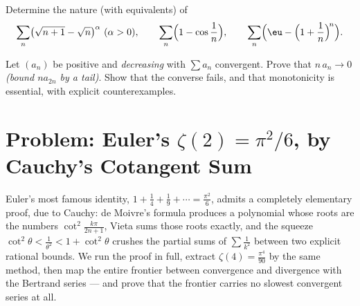\begin{exercise}[$\star\star$]\label{exo:b2:series:11}
Determine the nature (with equivalents) of
\[
\sum_n \bigl(\sqrt{n+1} - \sqrt n\bigr)^{\alpha}
\ (\alpha > 0), \qquad
\sum_n \Bigl(1 - \cos\frac1n\Bigr), \qquad
\sum_n \Bigl(\eu - \Bigl(1 + \frac1n\Bigr)^{\!n}\Bigr).
\]
\end{exercise}

\begin{exercise}[$\star\star\star$]\label{exo:b2:series:12}
Let $(a_n)$ be positive and \emph{decreasing} with $\sum a_n$
convergent. Prove that $n\,a_n \to 0$ \emph{(bound $n a_{2n}$ by a
tail)}. Show that the converse fails, and that monotonicity is
essential, with explicit counterexamples.
\end{exercise}

\section{Problem: Euler's $\zeta(2) = \pi^2/6$, by Cauchy's
Cotangent Sum}

Euler's most famous identity, $1 + \frac14 + \frac19 + \cdots =
\frac{\pi^2}6$, admits a completely elementary proof, due to
Cauchy: de Moivre's formula produces a polynomial whose roots are
the numbers $\cot^2\frac{k\pi}{2n+1}$, Vieta sums those roots
exactly, and the squeeze $\cot^2\theta < \frac{1}{\theta^2} <
1 + \cot^2\theta$ crushes the partial sums of $\sum\frac1{k^2}$
between two explicit rational bounds. We run the proof in full,
extract $\zeta(4) = \frac{\pi^4}{90}$ by the same method, then
map the entire frontier between convergence and divergence with
the Bertrand series --- and prove that the frontier carries no
slowest convergent series at all.

